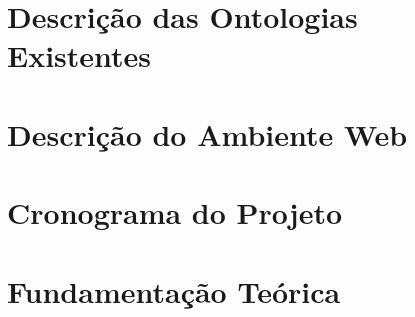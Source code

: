 \section{Descrição das Ontologias Existentes} %
\label{sec:introdu_o}
 

\section{Descrição do Ambiente Web} %
\label{sec:introdu_o}
 

\section{Cronograma do Projeto} %
\label{sec:produtos}
 

\section{Fundamentação Teórica} %
\label{sec:resultados_esperados}
 
